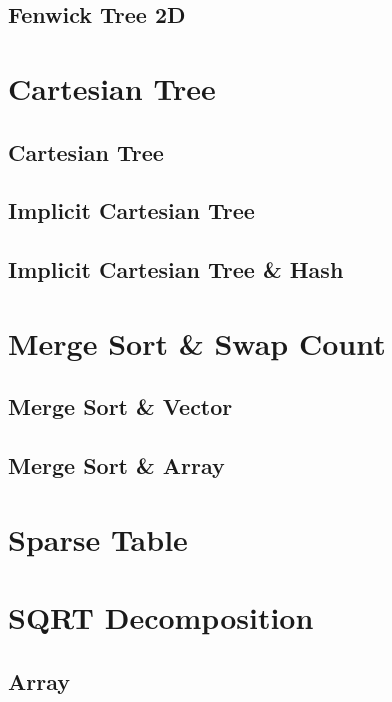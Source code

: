 \documentclass[10pt,a4paper]{report}
\begin{document}
		\subsection{Fenwick Tree 2D}
			
	\newpage	
	\section{Cartesian Tree}
		\subsection{Cartesian Tree}
			
		\newpage
		\subsection{Implicit Cartesian Tree}
			
		\newpage
		\subsection{Implicit Cartesian Tree \& Hash}
			
	\newpage		
	\section{Merge Sort \& Swap Count}
		\subsection{Merge Sort \& Vector}
			
		\newpage
		\subsection{Merge Sort \& Array}
			
	\newpage
	\section{Sparse Table}
		
	\newpage	
	\section{SQRT Decomposition}
		\subsection{Array}
			
		\newpage
\end{document}
